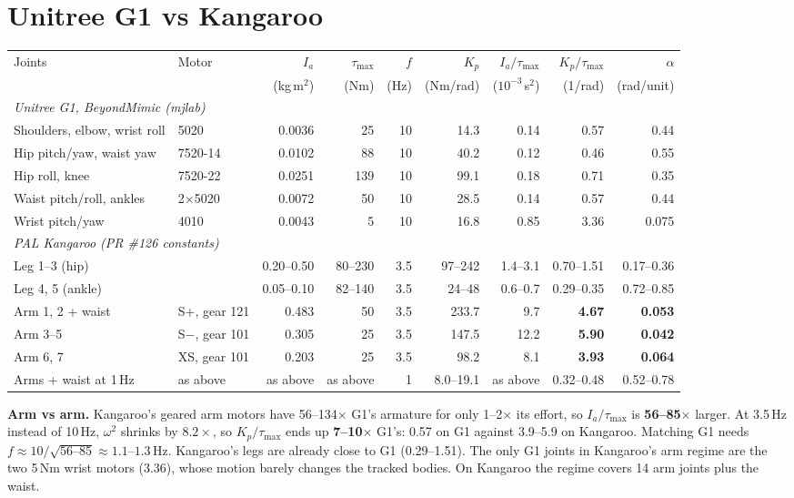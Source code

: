 \documentclass[10pt]{article}
\begin{document}
\section{Unitree G1 vs Kangaroo}

\begin{center}
\footnotesize
\setlength{\tabcolsep}{4pt}
\begin{tabular}{llrrrrrrr}
\toprule
Joints & Motor & $I_a$ & $\tau_{\max}$ & $f$ & $K_p$ & $I_a/\tau_{\max}$ & $K_p/\tau_{\max}$ & $\alpha$ \\
 & & (kg\,m$^2$) & (Nm) & (Hz) & (Nm/rad) & ($10^{-3}$\,s$^2$) & (1/rad) & (rad/unit) \\
\midrule
\multicolumn{9}{l}{\textit{Unitree G1, BeyondMimic (mjlab)}} \\
Shoulders, elbow, wrist roll & 5020 & 0.0036 & 25 & 10 & 14.3 & 0.14 & 0.57 & 0.44 \\
Hip pitch/yaw, waist yaw & 7520-14 & 0.0102 & 88 & 10 & 40.2 & 0.12 & 0.46 & 0.55 \\
Hip roll, knee & 7520-22 & 0.0251 & 139 & 10 & 99.1 & 0.18 & 0.71 & 0.35 \\
Waist pitch/roll, ankles & 2$\times$5020 & 0.0072 & 50 & 10 & 28.5 & 0.14 & 0.57 & 0.44 \\
Wrist pitch/yaw & 4010 & 0.0043 & 5 & 10 & 16.8 & 0.85 & 3.36 & 0.075 \\
\midrule
\multicolumn{9}{l}{\textit{PAL Kangaroo (PR \#126 constants)}} \\
Leg 1--3 (hip) & & 0.20--0.50 & 80--230 & 3.5 & 97--242 & 1.4--3.1 & 0.70--1.51 & 0.17--0.36 \\
Leg 4, 5 (ankle) & & 0.05--0.10 & 82--140 & 3.5 & 24--48 & 0.6--0.7 & 0.29--0.35 & 0.72--0.85 \\
Arm 1, 2 + waist & S+, gear 121 & 0.483 & 50 & 3.5 & 233.7 & 9.7 & \textbf{4.67} & \textbf{0.053} \\
Arm 3--5 & S$-$, gear 101 & 0.305 & 25 & 3.5 & 147.5 & 12.2 & \textbf{5.90} & \textbf{0.042} \\
Arm 6, 7 & XS, gear 101 & 0.203 & 25 & 3.5 & 98.2 & 8.1 & \textbf{3.93} & \textbf{0.064} \\
Arms + waist at 1\,Hz & as above & as above & as above & 1 & 8.0--19.1 & as above & 0.32--0.48 & 0.52--0.78 \\
\bottomrule
\end{tabular}
\end{center}

\textbf{Arm vs arm.} Kangaroo's geared arm motors have 56--134$\times$ G1's armature for only
1--2$\times$ its effort, so $I_a/\tau_{\max}$ is \textbf{56--85$\times$} larger. At 3.5\,Hz instead of
10\,Hz, $\omega^2$ shrinks by $8.2\times$, so $K_p/\tau_{\max}$ ends up \textbf{7--10$\times$} G1's:
0.57 on G1 against 3.9--5.9 on Kangaroo. Matching G1 needs $f \approx 10/\sqrt{56\text{--}85} \approx 1.1$--$1.3$\,Hz.
Kangaroo's legs are already close to G1 (0.29--1.51). The only G1 joints in Kangaroo's arm regime are the two
5\,Nm wrist motors (3.36), whose motion barely changes the tracked bodies. On Kangaroo the regime covers
14 arm joints plus the waist.
\end{document}
